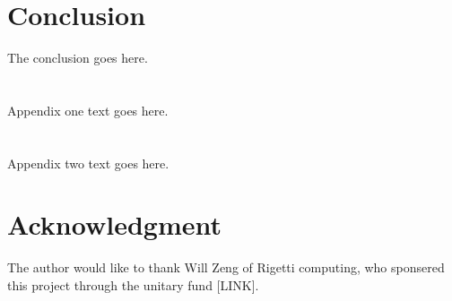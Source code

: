\documentclass[journal]{IEEEtran}
\begin{document}
\section{Conclusion}
The conclusion goes here.



\appendices
\section{}
Appendix one text goes here.

\section{}
Appendix two text goes here.


\section*{Acknowledgment}

The author would like to thank Will Zeng of Rigetti computing, who sponsered this project through the unitary fund [LINK].

\ifCLASSOPTIONcaptionsoff
  \newpage
\fi
\end{document}
